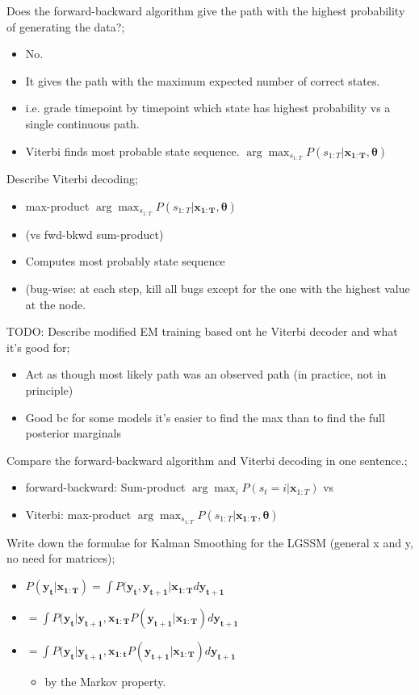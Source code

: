 \documentclass{article}
\begin{document}
Does the forward-backward algorithm give the path with the highest probability of generating the data?; \begin{itemize}
    \item No. 
    \item It gives the path with the maximum expected number of correct states.
    \item i.e. grade timepoint by timepoint which state has highest probability vs a single continuous path.
    \item Viterbi finds most probable state sequence. $\arg\max_{s_{1:T}}P(s_{1:T}|\mathbf{x_{1:T},\theta})$
\end{itemize}

Describe Viterbi decoding; \begin{itemize}
    \item max-product $\arg\max_{s_{1:T}}P(s_{1:T}|\mathbf{x_{1:T},\theta})$ 
    \item (vs fwd-bkwd sum-product)
    \item Computes most probably state sequence
    \item (bug-wise: at each step, kill all bugs except for the one with the highest value at the node.
\end{itemize}

TODO: Describe modified EM training based ont he Viterbi decoder and what it's good for; \begin{itemize}
    \item Act as though most likely path was an observed path (in practice, not in principle)
    \item Good bc for some models it's easier to find the max than to find the full posterior marginals
\end{itemize}

Compare the forward-backward algorithm and Viterbi decoding in one sentence.; \begin{itemize}
    \item forward-backward: Sum-product $\arg\max_{i}P(s_t=i|\mathbf{x}_{1:T})$ vs
    \item Viterbi: max-product $\arg\max_{s_{1:T}}P(s_{1:T}|\mathbf{x_{1:T},\theta})$
\end{itemize}

Write down the formulae for Kalman Smoothing for the LGSSM (general x and y, no need for matrices); \begin{itemize}
    \item $P(\mathbf{y_t|x_{1:T}})=\int P(\mathbf{y_t, y_{t+1}|x_{1:T}}d\mathbf{y_{t+1}}$
    \item $=\int P(\mathbf{y_t|y_{t+1},x_{1:T}}P(\mathbf{y_{t+1}|x_{1:T}}) d\mathbf{y_{t+1}}$
    \item $=\int P(\mathbf{y_t|y_{t+1},x_{1:t}}P(\mathbf{y_{t+1}|x_{1:T}}) d\mathbf{y_{t+1}}$
    \begin{itemize}
        \item by the Markov property.
    \end{itemize}
\end{itemize}
\end{document}
